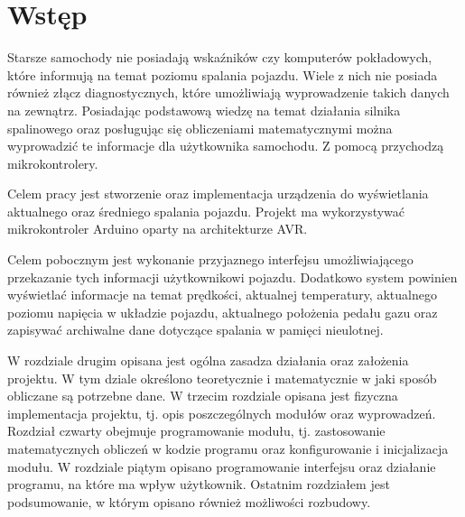 \chapter{Wstęp}
\par     Starsze samochody nie posiadają wskaźników czy komputerów pokładowych, które informują na temat poziomu spalania pojazdu. Wiele z nich nie posiada również złącz diagnostycznych, które umożliwiają wyprowadzenie takich danych na zewnątrz. Posiadając podstawową wiedzę na temat działania silnika spalinowego oraz posługując się obliczeniami matematycznymi można wyprowadzić te informacje dla użytkownika samochodu. Z pomocą przychodzą mikrokontrolery.
\par Celem pracy jest stworzenie oraz implementacja urządzenia do wyświetlania aktualnego oraz średniego spalania pojazdu. Projekt ma wykorzystywać mikrokontroler Arduino oparty na architekturze AVR.
\par Celem pobocznym jest wykonanie przyjaznego interfejsu umożliwiającego przekazanie tych informacji użytkownikowi pojazdu. Dodatkowo system powinien wyświetlać informacje na temat prędkości, aktualnej temperatury, aktualnego poziomu napięcia w układzie pojazdu, aktualnego położenia pedału gazu oraz zapisywać archiwalne dane dotyczące spalania w pamięci nieulotnej.
\par W rozdziale drugim opisana jest ogólna zasadza działania oraz założenia projektu. W tym dziale określono teoretycznie i matematycznie w jaki sposób obliczane są potrzebne dane. W trzecim rozdziale opisana jest fizyczna implementacja projektu, tj. opis poszczególnych modułów oraz wyprowadzeń. Rozdział czwarty obejmuje programowanie modułu, tj. zastosowanie matematycznych obliczeń w kodzie programu oraz konfigurowanie i inicjalizacja modułu. W rozdziale piątym opisano programowanie interfejsu oraz działanie programu, na które ma wpływ użytkownik. Ostatnim rozdziałem jest podsumowanie, w którym opisano również możliwości rozbudowy.